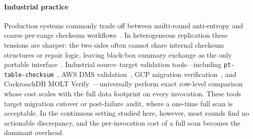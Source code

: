 \paragraph{Industrial practice}
Production systems commonly trade off between multi-round anti-entropy
and coarse per-range checksum
workflows~\cite{decandia2007dynamo,lakshman2010cassandra,gonccalves2017dotteddb,taft2020cockroachdb}.
In heterogeneous replication these tensions are sharper: the two sides
often cannot share internal checksum structures or repair logic, leaving
black-box summary exchange as the only portable
interface~\cite{vogels2009eventually,terry1995managing,lloyd2011don,shapiro2011conflict}.
Industrial source--target validation tools---including
\texttt{pt-table-checksum}~\cite{percona-pt}, AWS DMS
validation~\cite{aws-dms-validation}, GCP migration
verification~\cite{gcp-dms-verify-migration}, and CockroachDB MOLT
Verify~\cite{cockroach-molt-verify}---universally perform exact
row-level comparison whose cost scales with the full data footprint
on every invocation.
These tools target migration cutover or post-failure audit, where a one-time full scan is acceptable. In the continuous setting studied here, however, most rounds find no actionable discrepancy, and the per-invocation cost of a full scan becomes the dominant overhead.
